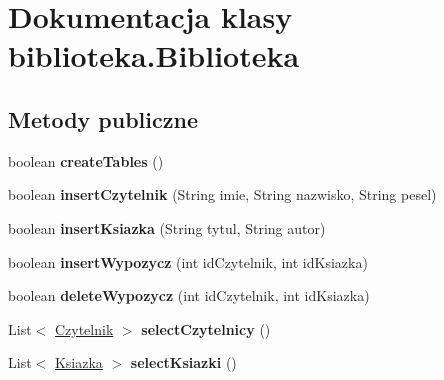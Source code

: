 \hypertarget{classbiblioteka_1_1_biblioteka}{}\section{Dokumentacja klasy biblioteka.\+Biblioteka}
\label{classbiblioteka_1_1_biblioteka}
\subsection*{Metody publiczne}
\begin{DoxyCompactItemize}
\item 
\hypertarget{classbiblioteka_1_1_biblioteka_aec6840e69d3f1fb90bc10923a54ea05d}{}boolean {\bfseries create\+Tables} ()\label{classbiblioteka_1_1_biblioteka_aec6840e69d3f1fb90bc10923a54ea05d}

\item 
\hypertarget{classbiblioteka_1_1_biblioteka_a543eca0bfd67c61dc67ab8c00a55d615}{}boolean {\bfseries insert\+Czytelnik} (String imie, String nazwisko, String pesel)\label{classbiblioteka_1_1_biblioteka_a543eca0bfd67c61dc67ab8c00a55d615}

\item 
\hypertarget{classbiblioteka_1_1_biblioteka_aa11038d7dc6b4c3c105f8fd522012e98}{}boolean {\bfseries insert\+Ksiazka} (String tytul, String autor)\label{classbiblioteka_1_1_biblioteka_aa11038d7dc6b4c3c105f8fd522012e98}

\item 
\hypertarget{classbiblioteka_1_1_biblioteka_a7d441e9629d5df4fead45666bd608596}{}boolean {\bfseries insert\+Wypozycz} (int id\+Czytelnik, int id\+Ksiazka)\label{classbiblioteka_1_1_biblioteka_a7d441e9629d5df4fead45666bd608596}

\item 
\hypertarget{classbiblioteka_1_1_biblioteka_ae3008a6f5ec7c42cb9ce051c70b882c5}{}boolean {\bfseries delete\+Wypozycz} (int id\+Czytelnik, int id\+Ksiazka)\label{classbiblioteka_1_1_biblioteka_ae3008a6f5ec7c42cb9ce051c70b882c5}

\item 
\hypertarget{classbiblioteka_1_1_biblioteka_ad6ac7eb8ee418e42d6932af5726e8e45}{}List$<$ \hyperlink{classmodel_1_1_czytelnik}{Czytelnik} $>$ {\bfseries select\+Czytelnicy} ()\label{classbiblioteka_1_1_biblioteka_ad6ac7eb8ee418e42d6932af5726e8e45}

\item 
\hypertarget{classbiblioteka_1_1_biblioteka_a59e88d76a498f36be2c0e7611cc1d598}{}List$<$ \hyperlink{classmodel_1_1_ksiazka}{Ksiazka} $>$ {\bfseries select\+Ksiazki} ()\label{classbiblioteka_1_1_biblioteka_a59e88d76a498f36be2c0e7611cc1d598}


\end{DoxyCompactItemize}
